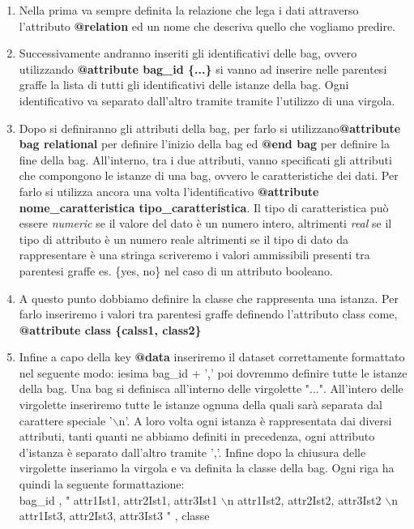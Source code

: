 \begin{enumerate}
        \item Nella prima va sempre definita la relazione che lega i dati attraverso l'attributo \textbf{@relation} ed un nome che descriva quello che vogliamo predire.  
        
        \item Successivamente andranno inseriti gli identificativi delle bag, ovvero utilizzando \textbf{@attribute bag\_id \{...\}} si vanno ad inserire nelle parentesi graffe la lista di tutti gli identificativi delle istanze della bag. Ogni identificativo va separato dall'altro tramite tramite l'utilizzo di una virgola. 
        
        \item Dopo si definiranno gli attributi della bag, per farlo si utilizzano\textbf{@attribute bag relational} per definire l'inizio della bag ed \textbf{@end bag} per definire la fine della bag. All'interno, tra i due attributi, vanno specificati gli attributi che compongono le istanze di una bag, ovvero le caratteristiche dei dati. Per farlo si utilizza ancora una volta l'identificativo \textbf{@attribute nome\_caratteristica tipo\_caratteristica}. Il tipo di caratteristica può essere \textit{numeric} se il valore del dato è un numero intero, altrimenti \textit{real} se il tipo di attributo è un numero reale altrimenti se il tipo di dato da rappresentare è una stringa scriveremo i valori ammissibili presenti tra parentesi graffe es. {\{yes, no\}} nel caso di un attributo booleano.
        
        \item A questo punto dobbiamo definire la classe che rappresenta una istanza. Per farlo inseriremo i valori tra parentesi graffe definendo l'attributo class come, \textbf{@attribute class \{calss1, class2\}}
        
        \item Infine a capo della key \textbf{@data} inseriremo il dataset correttamente formattato nel seguente modo: iesima bag\_id + ',' poi dovremmo definire tutte le istanze della bag. Una bag si definisca all'interno delle virgolette "...". All'intero delle virgolette inseriremo tutte le istanze ognuna della quali sarà separata dal carattere speciale '$\backslash$n'. A loro volta ogni istanza è rappresentata dai diversi attributi, tanti quanti ne abbiamo definiti in precedenza, ogni attributo d'istanza è separato dall'altro tramite ','. Infine dopo la chiusura delle virgolette inseriamo la virgola e va definita la classe della bag. Ogni riga ha quindi la seguente formattazione:
        \\\footnotesize {
        bag\_id , " attr1Ist1, attr2Ist1, attr3Ist1 $\backslash$n attr1Ist2, attr2Ist2, attr3Ist2 $\backslash$n attr1Ist3, attr2Ist3, attr3Ist3 " , classe  }
    \end{enumerate}
